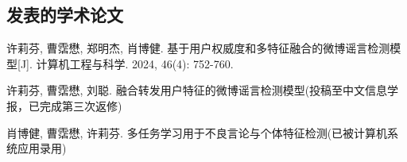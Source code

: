 \begin{resume}

  \section*{发表的学术论文} %

  \begin{enumerate}[{[}1{]}]
  \addtolength{\itemsep}{-.36\baselineskip}%
  \item 许莉芬, 曹霑懋, 郑明杰, 肖博健. 基于用户权威度和多特征融合的微博谣言检测模型[J]. 计算机工程与科学. 2024,  46(4): 752-760.
    
    \item 许莉芬, 曹霑懋, 刘聪. 融合转发用户特征的微博谣言检测模型(投稿至中文信息学报，已完成第三次返修)

  \item 肖博健, 曹霑懋, 许莉芬. 多任务学习用于不良言论与个体特征检测(已被计算机系统应用录用)


\end{enumerate}
\end{resume}